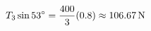 \documentclass[preview]{standalone}
\begin{document}
\begin{align*}
\special{dvisvgm:raw <g id='unique000'>}T_3 \sin 53^\circ = \frac{400}{3}(0.8) \approx 106.67\,\mathrm{N}\special{dvisvgm:raw </g>}
\end{align*}
\end{document}
